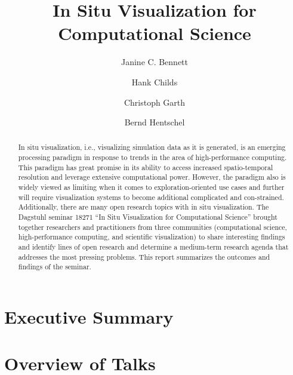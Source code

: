 \documentclass[a4paper,UKenglish]{dagrep}
\title{In Situ Visualization for Computational Science}
\author[1]{Janine C. Bennett}
\author[2]{Hank Childs}
\author[3]{Christoph Garth}
\author[4]{Bernd Hentschel}
\affil[1]{Sandia National Laboratories, Livermore}
\affil[2]{University of Oregon}
\affil[3]{Technische Universität Kaiserslautern}
\affil[4]{RWTH Aachen University}
\begin{document}
\maketitle

\begin{abstract}
In situ visualization, i.e., visualizing simulation data as it is generated, is an emerging processing paradigm in response to trends in the area of high-performance computing.  This paradigm has great promise in its ability to access increased spatio-temporal resolution and leverage extensive computational power.  However, the paradigm also is widely viewed as limiting when it comes to exploration-oriented use cases and further will require visualization systems to become additional complicated and con-strained.  Additionally, there are many open research topics with in situ visualization. The Dagstuhl seminar 18271 ``In Situ Visualization for Computational Science'' brought together researchers and practitioners from three communities (computational science, high-performance computing, and scientific visualization) to share interesting findings and identify lines of open research and determine a medium-term research agenda that addresses the most pressing problems. This report summarizes the outcomes and findings of the seminar.
\end{abstract}

\section{Executive Summary}

\license




\tableofcontents


\section{Overview of Talks}
\end{document}
